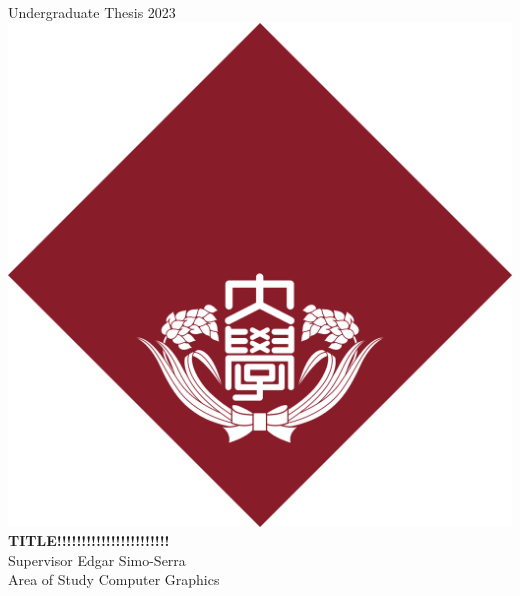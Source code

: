 \documentclass[a4paper, oneside, uplatex, 12pt]{book}
\begin{document}


\begin{titlepage}
\begin{center}
    \vspace{0.1\textheight}
    {\Large Undergraduate Thesis 2023} \\
    \vspace{0.05\textheight}
    \includegraphics[width=48truemm]{resources/0_title/waseda_logo.png} \\
    \vspace{0.05\textheight}
    \textbf{\huge TITLE!!!!!!!!!!!!!!!!!!!!!!!} \\
    \vfill
    {\Large Supervisor \hspace{0.02\textwidth} Edgar Simo-Serra} \\
    {\Large Area of Study \hspace{0.02\textwidth} Computer Graphics} \\

\end{center}
\end{titlepage}
\end{document}
